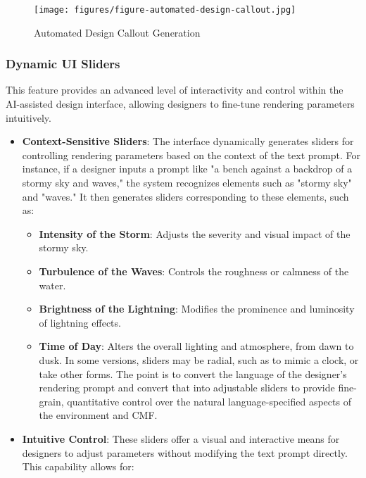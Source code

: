 \documentclass[12pt]{article}
\begin{document}
\begin{figure}[h]
    \centering
    \texttt{[image: figures/figure-automated-design-callout.jpg]}
    \caption{Automated Design Callout Generation}
    \label{fig:automated-design-callout}
\end{figure}

\subsubsection{Dynamic UI Sliders}

This feature provides an advanced level of interactivity and control within the AI-assisted design interface, allowing designers to fine-tune rendering parameters intuitively.

\begin{itemize}
    \item \textbf{Context-Sensitive Sliders}: The interface dynamically generates sliders for controlling rendering parameters based on the context of the text prompt. For instance, if a designer inputs a prompt like "a bench against a backdrop of a stormy sky and waves," the system recognizes elements such as "stormy sky" and "waves." It then generates sliders corresponding to these elements, such as:

    \begin{itemize}
        \item \textbf{Intensity of the Storm}: Adjusts the severity and visual impact of the stormy sky.
        \item \textbf{Turbulence of the Waves}: Controls the roughness or calmness of the water.
        \item \textbf{Brightness of the Lightning}: Modifies the prominence and luminosity of lightning effects.
        \item \textbf{Time of Day}: Alters the overall lighting and atmosphere, from dawn to dusk. In some versions, sliders may be radial, such as to mimic a clock, or take other forms. The point is to convert the language of the designer's rendering prompt and convert that into adjustable sliders to provide fine-grain, quantitative control over the natural language-specified aspects of the environment and CMF.
    \end{itemize}

    \item \textbf{Intuitive Control}: These sliders offer a visual and interactive means for designers to adjust parameters without modifying the text prompt directly. This capability allows for:


\end{itemize}
\end{document}
